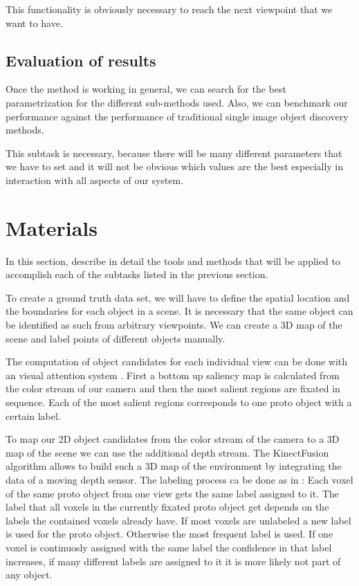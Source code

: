 \documentclass[a4paper,11pt,english]{article}
\begin{document}
This functionality is obviously necessary to reach the next viewpoint that we want to have.

\subsection{Evaluation of results}
Once the method is working in general, we can search for the best parametrization for the different sub-methods used.
Also, we can benchmark our performance against the performance of traditional single image object discovery methods.

This subtask is necessary, because there will be many different parameters that we have to set and it will not be obvious which values are the best especially in interaction with all aspects of our system.

\section{Materials}
In this section, describe in detail the tools and methods that will be applied to accomplish each of the subtasks listed in the previous section.\medskip

To create a ground truth data set, we will have to define the spatial location and the boundaries for each object in a scene.
It is necessary that the same object can be identified as such from arbitrary viewpoints.
We can create a 3D map of the scene and label points of different objects manually.

The computation of object candidates for each individual view can be done with an visual attention system \cite{Frintrop 2013}.
First a bottom up saliency map is calculated from the color stream of our camera and then the most salient regions are fixated in sequence.
Each of the most salient regions corresponds to one proto object with a certain label.

To map our 2D object candidates from the color stream of the camera to a 3D map of the scene we can use the additional depth stream. The KinectFusion algorithm allows to build such a 3D map of the environment by integrating the data of a moving depth sensor.
The labeling process ca be done as in \cite{Frintrop 2013}:
Each voxel of the same proto object from one view gets the same label assigned to it.
The label that all voxels in the currently fixated proto object get depends on the labels the contained voxels already have.
If most voxels are unlabeled a new label is used for the proto object.
Otherwise the most frequent label is used.
If one voxel is continuosly assigned with the same label the confidence in that label increases, if many different labels are assigned to it it is more likely not part of any object.
\end{document}
